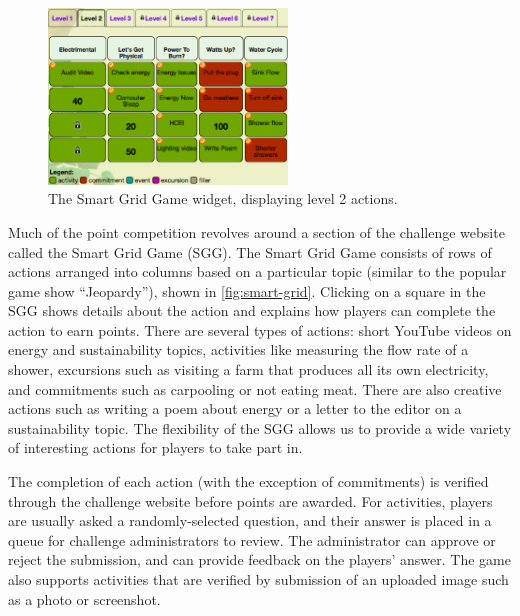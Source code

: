 \documentclass[10pt, conference, compsocconf]{IEEEtran}
\begin{document}
\begin{figure}[!tb]
	\centering
	\includegraphics[width=2.5in]{smart-grid2.eps}
	\caption{The Smart Grid Game widget, displaying level 2 actions.}
	\label{fig:smart-grid}
\end{figure}

Much of the point competition revolves around a section of the challenge website called the Smart Grid Game (SGG). The Smart Grid Game consists of rows of actions arranged into columns based on a particular topic (similar to the popular game show ``Jeopardy''), shown in \autoref{fig:smart-grid}. Clicking on a square in the SGG shows details about the action and explains how players can complete the action to earn points. There are several types of actions: short YouTube videos on energy and sustainability topics, activities like measuring the flow rate of a shower, excursions such as visiting a farm that produces all its own electricity, and commitments such as carpooling or not eating meat. There are also creative actions such as writing a poem about energy or a letter to the editor on a sustainability topic. The flexibility of the SGG allows us to provide a wide variety of interesting actions for players to take part in.

The completion of each action (with the exception of commitments) is verified through the challenge website before points are awarded. For activities, players are usually asked a randomly-selected question, and their answer is placed in a queue for challenge administrators to review. The administrator can approve or reject the submission, and can provide feedback on the players' answer. The game also supports activities that are verified by submission of an uploaded image such as a photo or screenshot.
\end{document}
